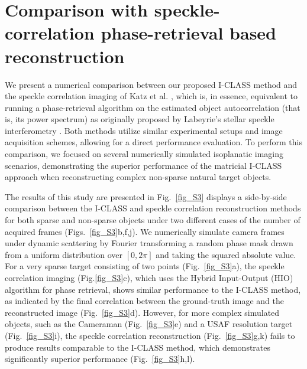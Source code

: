 \documentclass[pdflatex,sn-mathphys-num,Numbered]{sn-jnl}%
\theoremstyle{thmstyleone}%
\theoremstyle{thmstyletwo}%
\theoremstyle{thmstylethree}%
\begin{document}
\pagebreak



\section{Comparison with speckle-correlation phase-retrieval based reconstruction}

We present a numerical comparison between our proposed I-CLASS method and the speckle correlation imaging of Katz et al. \cite{katz14}, which is, in essence, equivalent to running a phase-retrieval algorithm on the estimated object autocorrelation (that is, its power spectrum) as originally proposed by Labeyrie's stellar speckle interferometry \cite{labeyrie1970attainment}. %
Both methods utilize similar experimental setups and image acquisition schemes, allowing for a direct performance evaluation. To perform this comparison, we focused on several numerically simulated isoplanatic imaging scenarios, demonstrating the superior performance of the matricial I-CLASS approach when reconstructing complex non-sparse natural target objects.

The results of this study are presented in Fig.~\ref{fig_S3} displays a side-by-side comparison between the I-CLASS and speckle correlation reconstruction methods for both sparse and non-sparse objects under two different cases of the number of acquired frames (Figs.~\ref{fig_S3}b,f,j). We numerically simulate camera frames under dynamic scattering by Fourier transforming a random phase mask drawn from a uniform distribution over $[0, 2\pi]$ and taking the squared absolute value. For a very sparse target consisting of two points (Fig.~\ref{fig_S3}a), the speckle correlation imaging (Fig.\ref{fig_S3}c), which uses the Hybrid Input-Output (HIO) algorithm \cite{fienup1978reconstruction} for phase retrieval, shows similar performance to the I-CLASS method, as indicated by the final correlation between the ground-truth image and the reconstructed image (Fig.~\ref{fig_S3}d). However, for more complex simulated objects, such as the Cameraman (Fig.~\ref{fig_S3}e) and a USAF resolution target (Fig.~\ref{fig_S3}i), the speckle correlation reconstruction (Fig.~\ref{fig_S3}g,k) fails to produce results comparable to the I-CLASS method, which demonstrates significantly superior performance (Fig.~\ref{fig_S3}h,l).
\pagebreak
\end{document}
